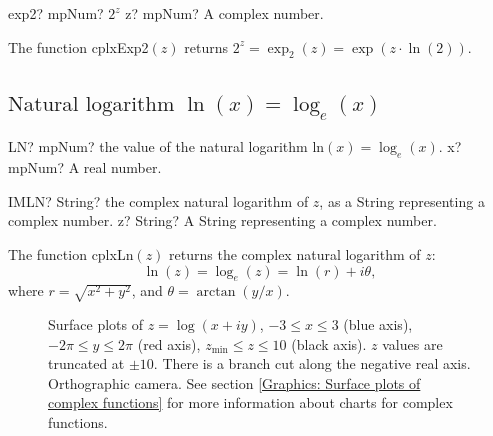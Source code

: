 \begin{mpFunctionsExtract}
	\mpFunctionOne
	{exp2? mpNum?  $2^z$}
	{z? mpNum? A complex number.}
\end{mpFunctionsExtract}

\vspace{0.3cm}
The function \textsf{cplxExp2$(z)$} returns $2^z = \exp_{2}(z) =  \exp(z \cdot \ln(2))$.






\newpage

\subsection{\texorpdfstring{$\text{Natural logarithm  }\ln(x) = \log_e(x)$}{ln}}

\begin{mpFunctionsExtract}
	\mpWorksheetFunctionOneNotImplemented
	{LN? mpNum? the value of the natural logarithm $\text{ln}(x) = \log_e(x)$.}
	{x? mpNum? A real number.}
\end{mpFunctionsExtract}


\vspace{0.6cm}
\begin{mpFunctionsExtract}
	\mpWorksheetFunctionOneNotImplemented
	{IMLN? String? the complex natural logarithm of $z$, as a String representing a complex number.}
	{z? String? A String representing a complex number.}
\end{mpFunctionsExtract}

\vspace{0.3cm}
The function \textsf{cplxLn$(z)$} returns the complex natural logarithm of $z$: 
\begin{equation}
	\ln(z)= \log_e(z) = \ln(r) + i \theta,
\end{equation}
where $r=\sqrt{x^2+y^2}$, and $\theta=\arctan(y/x)$.


\begin{figure}[ht]%
	\centering
	\qquad
	\caption[Complex Logarithm]{Surface plots of $z = \log(x + iy)$, $-3 \leq x \leq 3$ (blue axis), $-2 \pi \leq y \leq 2\pi$ (red axis), $z_{\text{min}} \leq z \leq 10$ (black axis). $z$ values are truncated at $\pm 10$. There is a branch cut along the negative real axis. Orthographic camera. See section \ref{Graphics: Surface plots of complex functions} for more information about charts for complex functions.} 
	\label{fig:Complex Logarithm}%
\end{figure}


